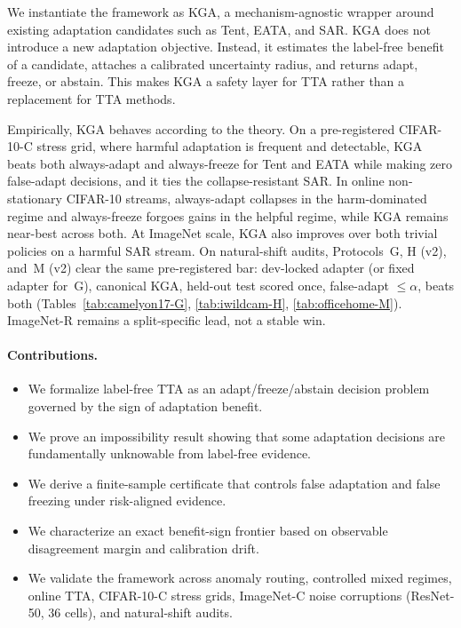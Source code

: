 \documentclass[conference]{IEEEtran}
\theoremstyle{plain}
\theoremstyle{definition}
\begin{document}
We instantiate the framework as \textsc{KGA}, a mechanism-agnostic wrapper around
existing adaptation candidates such as Tent, EATA, and SAR. \textsc{KGA} does not
introduce a new adaptation objective. Instead, it estimates the label-free benefit
of a candidate, attaches a calibrated uncertainty radius, and returns adapt,
freeze, or abstain. This makes \textsc{KGA} a safety layer for TTA rather than a
replacement for TTA methods.

Empirically, \textsc{KGA} behaves according to the theory. On a pre-registered
CIFAR-10-C stress grid, where harmful adaptation is frequent and detectable,
\textsc{KGA} beats both always-adapt and always-freeze for Tent and EATA while
making zero false-adapt decisions, and it ties the collapse-resistant SAR. In
online non-stationary CIFAR-10 streams, always-adapt collapses in the harm-dominated
regime and always-freeze forgoes gains in the helpful regime, while \textsc{KGA}
remains near-best across both. At ImageNet scale, \textsc{KGA} also improves over
both trivial policies on a harmful SAR stream. On natural-shift audits, Protocols~G,
H (v2), and~M (v2) clear the same pre-registered bar: dev-locked adapter (or fixed
adapter for~G), canonical \textsc{KGA}, held-out test scored once, false-adapt
$\le\alpha$, beats both (Tables~\ref{tab:camelyon17-G}, \ref{tab:iwildcam-H},
\ref{tab:officehome-M}). ImageNet-R remains a split-specific lead, not a stable win.

\paragraph{Contributions.}
\begin{itemize}
\item We formalize label-free TTA as an adapt/freeze/abstain decision problem governed by the sign of adaptation benefit.
\item We prove an impossibility result showing that some adaptation decisions are fundamentally unknowable from label-free evidence.
\item We derive a finite-sample certificate that controls false adaptation and false freezing under risk-aligned evidence.
\item We characterize an exact benefit-sign frontier based on observable disagreement margin and calibration drift.
\item We validate the framework across anomaly routing, controlled mixed regimes, online TTA, CIFAR-10-C stress grids, ImageNet-C noise corruptions (ResNet-50, $36$ cells), and natural-shift audits.
\end{itemize}
\end{document}
